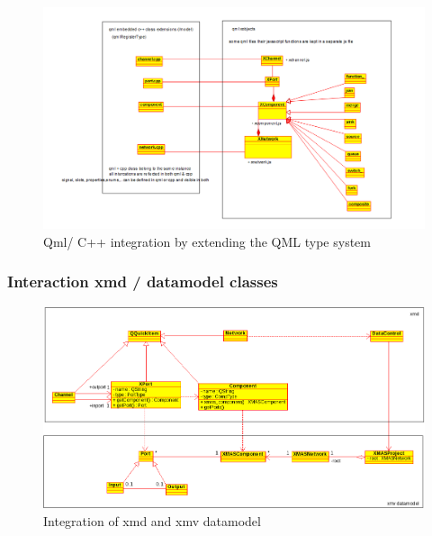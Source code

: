 \begin{figure}
    \includegraphics[width=\textwidth]{qml-cpp-extension}
    \caption{Qml/ C++ integration by extending the QML type system}
    \label{fig:qml-cpp-classes}
\end{figure}


\subsubsection{Interaction xmd / datamodel classes}

\begin{figure}
    \includegraphics[width=\textwidth]{xmd-xmv-integration}
    \caption{Integration of xmd and xmv datamodel}
\end{figure}
